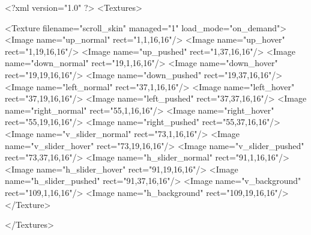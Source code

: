 <?xml version="1.0" ?>
<Textures>

	<Texture filename="scroll_skin" managed="1" load_mode="on_demand">
		<Image name="up_normal" rect="1,1,16,16"/>
		<Image name="up_hover" rect="1,19,16,16"/>
		<Image name="up_pushed" rect="1,37,16,16"/>
		<Image name="down_normal" rect="19,1,16,16"/>
		<Image name="down_hover" rect="19,19,16,16"/>
		<Image name="down_pushed" rect="19,37,16,16"/>
		<Image name="left_normal" rect="37,1,16,16"/>
		<Image name="left_hover" rect="37,19,16,16"/>
		<Image name="left_pushed" rect="37,37,16,16"/>
		<Image name="right_normal" rect="55,1,16,16"/>
		<Image name="right_hover" rect="55,19,16,16"/>
		<Image name="right_pushed" rect="55,37,16,16"/>
		<Image name="v_slider_normal" rect="73,1,16,16"/>
		<Image name="v_slider_hover" rect="73,19,16,16"/>
		<Image name="v_slider_pushed" rect="73,37,16,16"/>
		<Image name="h_slider_normal" rect="91,1,16,16"/>
		<Image name="h_slider_hover" rect="91,19,16,16"/>
		<Image name="h_slider_pushed" rect="91,37,16,16"/>
		<Image name="v_background" rect="109,1,16,16"/>
		<Image name="h_background" rect="109,19,16,16"/>
	</Texture>
	
</Textures>
